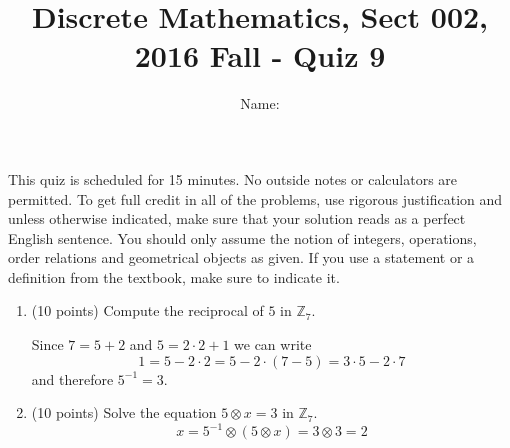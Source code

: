 \documentclass[11pt]{preprint}
\title{Discrete Mathematics, Sect 002, 2016 Fall - Quiz 9}
\author{Name:}
\institute{Courant Institute of Mathematical Sciences, NYU}
\begin{document}
\maketitle

This quiz is scheduled for 15 minutes. No outside notes or calculators are permitted. To get full credit  in all of the problems, use rigorous justification and unless otherwise indicated, make sure that your solution reads as a perfect English sentence. You should only assume the notion of integers, operations, order relations and geometrical objects as given. If you use a statement or a definition from the textbook, make sure to indicate it.
\vspace{0.2cm}

\begin{enumerate}
\item(10 points) Compute the reciprocal of $5$ in $\mathbb{Z}_7$.

Since $7 = 5 + 2$ and $5= 2\cdot 2 +1$ we can write
\[
1=5-2\cdot 2=5-2\cdot(7-5)=3\cdot 5-2\cdot 7
\]
and therefore $5^{-1}=3$.

\vspace{5cm}
\item (10 points)  Solve the equation $5\otimes x=3$ in $\mathbb{Z}_7$.
\[
x = 5^{-1}\otimes(5\otimes x)=3\otimes 3 = 2
\]
\end{enumerate}
\end{document}
